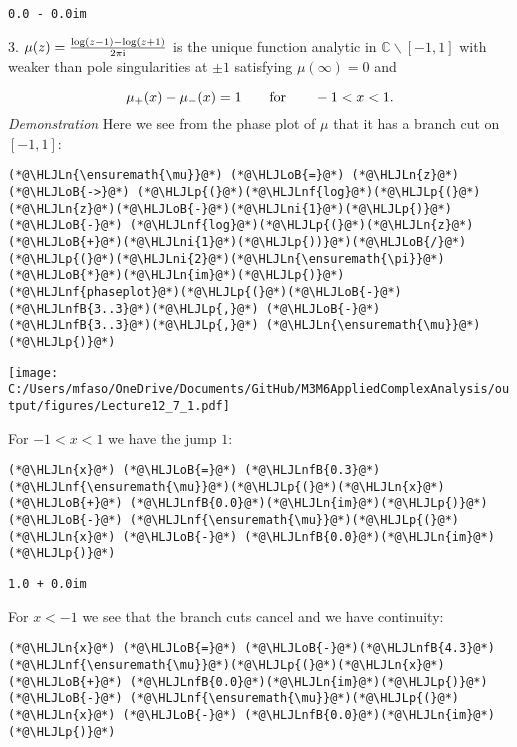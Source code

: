 \documentclass[12pt,a4paper]{article}
\newcommand{\HLJLn}[1]{#1}
\newcommand{\HLJLnf}[1]{\textcolor[RGB]{66,102,213}{#1}}
\newcommand{\HLJLnfB}[1]{\textcolor[RGB]{59,151,46}{#1}}
\newcommand{\HLJLni}[1]{\textcolor[RGB]{59,151,46}{#1}}
\newcommand{\HLJLoB}[1]{\textcolor[RGB]{102,102,102}{\textbf{#1}}}
\newcommand{\HLJLp}[1]{#1}
\def\qqfor{\qquad\hbox{for}\qquad}
\def\I{ {\rm i} }
\def\C{ {\mathbb C} }
\begin{document}
\begin{lstlisting}
0.0 - 0.0im
\end{lstlisting}


3. $\mu(z) = {\log(z -1) - \log(z+1) \over 2 \pi \I}$ is the unique function analytic in $\C \backslash [-1,1]$ with weaker than pole singularities at $\pm 1$ satisfying $\mu(\infty) = 0$ and

\[
\mu_+(x) - \mu_-(x) = 1 \qqfor -1 < x < 1.
\]
\emph{Demonstration} Here we see from the phase plot of $\mu$ that it has a branch cut on $[-1,1]$:


\begin{lstlisting}
(*@\HLJLn{\ensuremath{\mu}}@*) (*@\HLJLoB{=}@*) (*@\HLJLn{z}@*) (*@\HLJLoB{->}@*) (*@\HLJLp{(}@*)(*@\HLJLnf{log}@*)(*@\HLJLp{(}@*)(*@\HLJLn{z}@*)(*@\HLJLoB{-}@*)(*@\HLJLni{1}@*)(*@\HLJLp{)}@*) (*@\HLJLoB{-}@*) (*@\HLJLnf{log}@*)(*@\HLJLp{(}@*)(*@\HLJLn{z}@*)(*@\HLJLoB{+}@*)(*@\HLJLni{1}@*)(*@\HLJLp{))}@*)(*@\HLJLoB{/}@*)(*@\HLJLp{(}@*)(*@\HLJLni{2}@*)(*@\HLJLn{\ensuremath{\pi}}@*)(*@\HLJLoB{*}@*)(*@\HLJLn{im}@*)(*@\HLJLp{)}@*)
(*@\HLJLnf{phaseplot}@*)(*@\HLJLp{(}@*)(*@\HLJLoB{-}@*)(*@\HLJLnfB{3..3}@*)(*@\HLJLp{,}@*) (*@\HLJLoB{-}@*)(*@\HLJLnfB{3..3}@*)(*@\HLJLp{,}@*) (*@\HLJLn{\ensuremath{\mu}}@*)(*@\HLJLp{)}@*)
\end{lstlisting}

\texttt{[image: C:/Users/mfaso/OneDrive/Documents/GitHub/M3M6AppliedComplexAnalysis/output/figures/Lecture12\_7\_1.pdf]}

For $-1 < x < 1$ we have the jump $1$:


\begin{lstlisting}
(*@\HLJLn{x}@*) (*@\HLJLoB{=}@*) (*@\HLJLnfB{0.3}@*)
(*@\HLJLnf{\ensuremath{\mu}}@*)(*@\HLJLp{(}@*)(*@\HLJLn{x}@*) (*@\HLJLoB{+}@*) (*@\HLJLnfB{0.0}@*)(*@\HLJLn{im}@*)(*@\HLJLp{)}@*) (*@\HLJLoB{-}@*) (*@\HLJLnf{\ensuremath{\mu}}@*)(*@\HLJLp{(}@*)(*@\HLJLn{x}@*) (*@\HLJLoB{-}@*) (*@\HLJLnfB{0.0}@*)(*@\HLJLn{im}@*)(*@\HLJLp{)}@*)
\end{lstlisting}

\begin{lstlisting}
1.0 + 0.0im
\end{lstlisting}


For $x < -1$ we see that the branch cuts cancel and we have continuity:


\begin{lstlisting}
(*@\HLJLn{x}@*) (*@\HLJLoB{=}@*) (*@\HLJLoB{-}@*)(*@\HLJLnfB{4.3}@*)
(*@\HLJLnf{\ensuremath{\mu}}@*)(*@\HLJLp{(}@*)(*@\HLJLn{x}@*) (*@\HLJLoB{+}@*) (*@\HLJLnfB{0.0}@*)(*@\HLJLn{im}@*)(*@\HLJLp{)}@*) (*@\HLJLoB{-}@*) (*@\HLJLnf{\ensuremath{\mu}}@*)(*@\HLJLp{(}@*)(*@\HLJLn{x}@*) (*@\HLJLoB{-}@*) (*@\HLJLnfB{0.0}@*)(*@\HLJLn{im}@*)(*@\HLJLp{)}@*)
\end{lstlisting}
\end{document}
